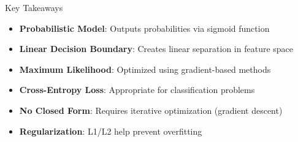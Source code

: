 \documentclass{beamer}
\begin{document}
\begin{frame}{Key Takeaways}
\begin{itemize}
\item \textbf{Probabilistic Model}: Outputs probabilities via sigmoid function
\pause
\item \textbf{Linear Decision Boundary}: Creates linear separation in feature space
\pause
\item \textbf{Maximum Likelihood}: Optimized using gradient-based methods
\pause
\item \textbf{Cross-Entropy Loss}: Appropriate for classification problems
\pause
\item \textbf{No Closed Form}: Requires iterative optimization (gradient descent)
\pause
\item \textbf{Regularization}: L1/L2 help prevent overfitting
\end{itemize}
\end{frame}
\end{document}
